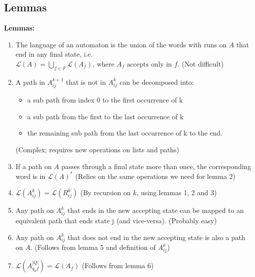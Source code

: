 \documentclass{beamer}
\begin{document}
\subsection*{Lemmas}
\begin{frame}
    \textbf{Lemmas:}

    
    \begin{enumerate}
        \item The language of an automaton is the union of the words with runs on $A$ that end in any final state, i.e. 
            $\mathcal{L}(A) = \bigcup_{f \in F} \mathcal{L}(A_f) \mbox {, where $A_f$ accepts only in $f$}.$ (Not difficult)
        \item
            A path in $A^{k+1}_{i j}$ that is not in $A^{k}_{i j}$ can be decomposed into:\\
            \begin{itemize}
                \item a sub path from index 0 to the first occurrence of k
                \item a sub path from the first to the last occurrence of k
                \item the remaining sub path from the last occurrence of k to the end.
            \end{itemize}
            (Complex; requires new operations on lists and paths)
    \end{enumerate}
    
\end{frame}

\begin{frame}

    \begin{enumerate}

    \setcounter{enumi}{2}
        \item If a path on $A$ passes through a final state more than once, the corresponding word is in $\mathcal{L}(A)^*$ (Relies on the same operations we need for lemma 2)
        \item 
            $\mathcal{L}(A^k_{i j}) = \mathcal{L}(R^k_{i j})$ (By recursion on $k$, using lemmas 1, 2 and 3)
    \end{enumerate}
\end{frame}

\begin{frame}
    \begin{enumerate}
    \setcounter{enumi}{4}
        \item Any path on $A^k_{i j}$ that ends in the new accepting state can be mapped to an equivalent path that ends state j (and vice-versa). (Probably easy)
        \item Any path on $A^k_{i j}$ that does not end in the new accepting state is also a path on $A$. (Follows from lemma 5 and definition of $A^k_{i j}$)
        \item $\mathcal{L}(A^{|Q|}_{q_0 f}) = \mathcal{L}(A_f)$ (Follows from lemma 6)
    \end{enumerate}

\end{frame}
\end{document}
